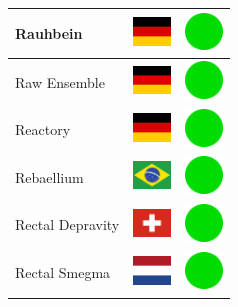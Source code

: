 \documentclass[12pt, a4paper, twoside]{report}
\begin{document}
\begin{center}
\begin{longtable}{|p{5cm}|p{2cm}|p{2cm}|}
 Rauhbein                                                   & \includegraphics[width=1cm]{../img/flags/de} &   \includegraphics[width=1cm]{../likes/y} \\ \hline
 Raw Ensemble                                               & \includegraphics[width=1cm]{../img/flags/de} &   \includegraphics[width=1cm]{../likes/y} \\ \hline
 Reactory                                                   & \includegraphics[width=1cm]{../img/flags/de} &   \includegraphics[width=1cm]{../likes/y} \\ \hline
 Rebaellium                                                 & \includegraphics[width=1cm]{../img/flags/br} &   \includegraphics[width=1cm]{../likes/y} \\ \hline
 Rectal Depravity                                           & \includegraphics[width=1cm]{../img/flags/ch} &   \includegraphics[width=1cm]{../likes/y} \\ \hline
 Rectal Smegma                                              & \includegraphics[width=1cm]{../img/flags/nl} &   \includegraphics[width=1cm]{../likes/y} \\ \hline

\end{longtable}
\end{center}
\end{document}
